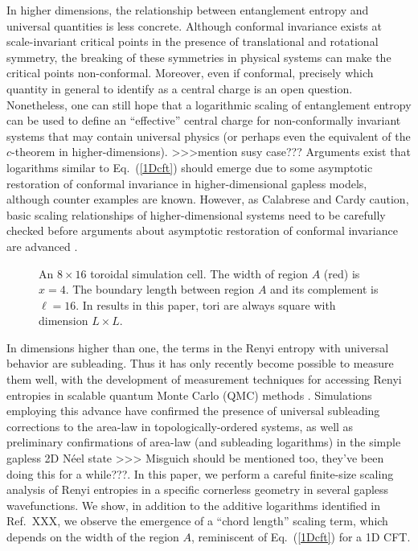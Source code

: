 \documentclass[prl,aps,twocolumn,floatfix,amsmath,amssymb,superscriptaddress,tightenlines]{revtex4}
\begin{document}
In higher dimensions, the relationship between entanglement entropy
and universal quantities is less concrete.  Although conformal
invariance exists at scale-invariant critical points in the presence
of translational and rotational symmetry, the breaking of these
symmetries in physical systems can make the critical points
non-conformal.  Moreover, even if conformal, precisely which quantity
in general to identify as a central charge is an open question.
Nonetheless, one can still hope that a logarithmic scaling of
entanglement entropy can be used to define an ``effective'' central
charge for non-conformally invariant systems that may contain
universal physics (or perhaps even the equivalent of the $c$-theorem
in higher-dimensions). >>>mention susy case??? Arguments exist that
logarithms similar to Eq.~(\ref{1Dcft}) should emerge due to some
asymptotic restoration of conformal invariance in higher-dimensional
gapless models, although counter examples are known.  However, as
Calabrese and Cardy caution, basic scaling relationships of
higher-dimensional systems need to be carefully checked before
arguments about asymptotic restoration of conformal invariance are
advanced \cite{EE_CFT}.

 \begin{figure}[ht]
   \begin{center}
   \end{center}
   \caption{An $8 \times 16$ toroidal simulation cell.  The width of region $A$ (red) is $x=4$.  The boundary length between region $A$ and its complement is $\ell = 16$.  In results in this paper, tori are always square with dimension $L \times L$. }
   \label{fig:torus}
 \end{figure}

In dimensions higher than one, the terms in the Renyi entropy with
universal behavior are subleading. Thus it has only recently become
possible to measure them well, with the development of measurement
techniques for accessing Renyi entropies in scalable quantum Monte
Carlo (QMC) methods \cite{swap}.  Simulations employing this advance
have confirmed the presence of universal subleading corrections to the
area-law in topologically-ordered systems, as well as preliminary
confirmations of area-law (and subleading logarithms) in the simple
gapless 2D N\'eel state >>> Misguich should be mentioned too, they've
been doing this for a while???.  In this paper, we perform a careful
finite-size scaling analysis of Renyi entropies in a specific
cornerless geometry in several gapless wavefunctions.  We show, in
addition to the additive logarithms identified in Ref.~XXX, we observe
the emergence of a ``chord length'' scaling term, which depends on the
width of the region $A$, reminiscent of Eq.~(\ref{1Dcft}) for a 1D
CFT.
\end{document}
